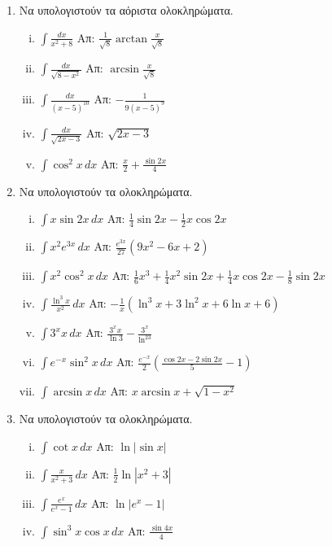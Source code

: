 \documentclass[a4paper,12pt]{article}
\begin{document}
\thispagestyle{empty}
\begin{center}
\end{center}
\vspace{\baselineskip}
\begin{enumerate}

\item Να υπολογιστούν τα αόριστα ολοκληρώματα.


\begin{enumerate}[i)]
\item $\int\frac{dx}{x^2+8} $ \hfill Απ: $\frac{1}{\sqrt{8}} \arctan \frac{x}{\sqrt{8}}$
\item $\int\frac{dx}{\sqrt{8-x^{2}}} $ \hfill Απ: $\arcsin \frac{x}{\sqrt{8}}$
\item $\int\frac{dx}{(x-5)^{10}} $ \hfill Απ: $-\frac{1}{9(x-5)^9}$
\item $ \int\frac{dx}{\sqrt{2x-3}}$ \hfill Απ: $ \sqrt{2x-3} $
\item $\int\cos^2x \, dx$ \hfill Απ: $\frac{x}{2} + \frac{\sin2x}{4}$
\end{enumerate}

\item Να υπολογιστούν τα ολοκληρώματα.

\begin{enumerate}[i)]
\item $\int x\sin2x \, dx$ \hfill Απ: $\frac{1}{4}\sin2x-\frac{1}{2}x\cos2x$
\item $\int x^2e^{3x} \, dx$ \hfill Απ: $\frac{e^{3x}}{27}(9x^2-6x+2)$
\item $\int x^2\cos^2x \, dx$ \hfill Απ: $\frac{1}{6}x^3 + \frac{1}{4}x^2\sin2x+\frac{1}{4}x\cos2x-\frac{1}{8}\sin2x$
\item $\int \frac{\ln^3x}{x^2} \, dx$ \hfill Απ: $-\frac{1}{x}(\ln^3x+3\ln^2x+6\ln x+6)$
\item $\int 3^{x}x \, dx$ \hfill Απ: $\frac{3^xx}{\ln3}-\frac{3^x}{\ln^23}$
\item $\int e^{-x}\sin^2x \, dx$ \hfill Απ: $\frac{e^{-x}}{2}\left(\frac{\cos2x-2\sin2x}{5}-1\right)$
\item $\int \arcsin x \, dx$ \hfill Απ: $x\arcsin x + \sqrt{1-x^2}$
\end{enumerate}

\item Να υπολογιστούν τα ολοκληρώματα.

\begin{enumerate}[i)]
\item $\int \cot x \, dx$ \hfill Απ: $\ln|\sin x|$
\item $\int\frac{x}{x^2+3} \, dx$ \hfill Απ: $\frac{1}{2}\ln|x^2+3|$
\item $\int \frac{e^x}{e^x-1} \, dx$ \hfill Απ: $\ln|e^x-1|$
\item $\int \sin^3x\cos x \, dx$ \hfill Απ: $\frac{\sin4x}{4}$
\end{enumerate}



\end{enumerate}
\end{document}
